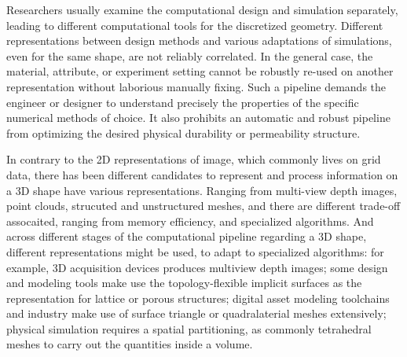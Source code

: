 Researchers usually examine the computational design and simulation separately, leading to different computational tools for the discretized geometry. Different representations between design methods and various adaptations of simulations, even for the same shape, are not reliably correlated. In the general case, the material, attribute, or experiment setting cannot be robustly re-used on another representation without laborious manually fixing. Such a pipeline demands the engineer or designer to understand precisely the properties of the specific numerical methods of choice. It also prohibits an automatic and robust pipeline from optimizing the desired physical durability or permeability structure. 

In contrary to the 2D representations of image, which commonly lives on grid data, there has been different candidates to represent and process information on a 3D shape have various representations. Ranging from multi-view depth images, point clouds, strucuted and unstructured meshes, and  there are different trade-off assocaited, ranging from memory efficiency, and specialized algorithms. And across different stages of the computational pipeline regarding a 3D shape, different representations might be used, to adapt to specialized algorithms: for example, 3D acquisition devices produces multiview depth images; some design and modeling tools make use the topology-flexible implicit surfaces as the representation for lattice or porous structures; digital asset modeling toolchains and industry make use of surface triangle or quadralaterial meshes extensively; physical simulation requires a spatial partitioning, as commonly tetrahedral meshes to carry out the quantities inside a volume. 

